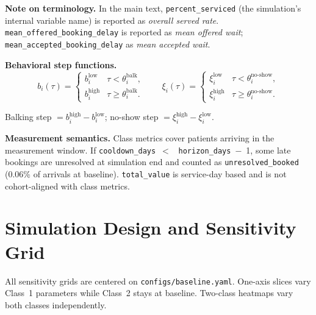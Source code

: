 \documentclass[11pt]{article}
\begin{document}
\noindent\textbf{Note on terminology.} In the main text,
\texttt{percent\_serviced} (the simulation's internal variable name) is
reported as \emph{overall served rate}. \texttt{mean\_offered\_booking\_delay}
is reported as \emph{mean offered wait}; \texttt{mean\_accepted\_booking\_delay}
as \emph{mean accepted wait}.

\medskip
\noindent\textbf{Behavioral step functions.}
\[
  b_i(\tau) = \begin{cases}
    b_i^{\text{low}} & \tau < \theta_i^{\text{balk}}, \\
    b_i^{\text{high}} & \tau \geq \theta_i^{\text{balk}}.
  \end{cases}
  \qquad
  \xi_i(\tau) = \begin{cases}
    \xi_i^{\text{low}} & \tau < \theta_i^{\text{no-show}}, \\
    \xi_i^{\text{high}} & \tau \geq \theta_i^{\text{no-show}}.
  \end{cases}
\]

Balking step $= b_i^{\text{high}} - b_i^{\text{low}}$; no-show step
$= \xi_i^{\text{high}} - \xi_i^{\text{low}}$.

\medskip
\noindent\textbf{Measurement semantics.} Class metrics cover patients
arriving in the measurement window. If \texttt{cooldown\_days}~$<$~%
\texttt{horizon\_days}~$-$~1, some late bookings are unresolved at
simulation end and counted as \texttt{unresolved\_booked} (0.06\% of
arrivals at baseline). \texttt{total\_value} is service-day based and
is not cohort-aligned with class metrics.

\section{Simulation Design and Sensitivity Grid}
\label{app:sens-design}

All sensitivity grids are centered on \texttt{configs/baseline.yaml}.
One-axis slices vary Class~1 parameters while Class~2 stays at baseline.
Two-class heatmaps vary both classes independently.
\end{document}
